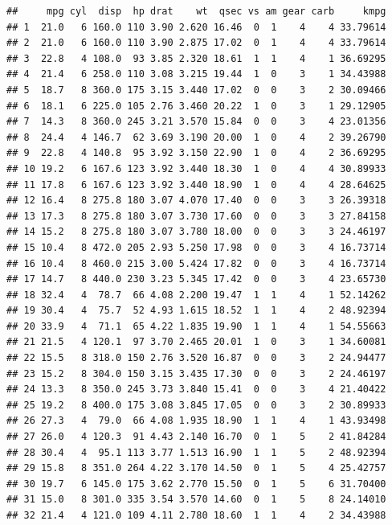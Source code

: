 \documentclass[]{report}
\newenvironment{Shaded}{\begin{snugshade}}{\end{snugshade}}
\newcommand{\KeywordTok}[1]{\textcolor[rgb]{0.13,0.29,0.53}{\textbf{#1}}}
\newcommand{\DataTypeTok}[1]{\textcolor[rgb]{0.13,0.29,0.53}{#1}}
\newcommand{\FloatTok}[1]{\textcolor[rgb]{0.00,0.00,0.81}{#1}}
\newcommand{\StringTok}[1]{\textcolor[rgb]{0.31,0.60,0.02}{#1}}
\newcommand{\OperatorTok}[1]{\textcolor[rgb]{0.81,0.36,0.00}{\textbf{#1}}}
\newcommand{\NormalTok}[1]{#1}
\begin{document}
\begin{Shaded}
\end{Shaded}

\begin{verbatim}
##     mpg cyl  disp  hp drat    wt  qsec vs am gear carb     kmpg
## 1  21.0   6 160.0 110 3.90 2.620 16.46  0  1    4    4 33.79614
## 2  21.0   6 160.0 110 3.90 2.875 17.02  0  1    4    4 33.79614
## 3  22.8   4 108.0  93 3.85 2.320 18.61  1  1    4    1 36.69295
## 4  21.4   6 258.0 110 3.08 3.215 19.44  1  0    3    1 34.43988
## 5  18.7   8 360.0 175 3.15 3.440 17.02  0  0    3    2 30.09466
## 6  18.1   6 225.0 105 2.76 3.460 20.22  1  0    3    1 29.12905
## 7  14.3   8 360.0 245 3.21 3.570 15.84  0  0    3    4 23.01356
## 8  24.4   4 146.7  62 3.69 3.190 20.00  1  0    4    2 39.26790
## 9  22.8   4 140.8  95 3.92 3.150 22.90  1  0    4    2 36.69295
## 10 19.2   6 167.6 123 3.92 3.440 18.30  1  0    4    4 30.89933
## 11 17.8   6 167.6 123 3.92 3.440 18.90  1  0    4    4 28.64625
## 12 16.4   8 275.8 180 3.07 4.070 17.40  0  0    3    3 26.39318
## 13 17.3   8 275.8 180 3.07 3.730 17.60  0  0    3    3 27.84158
## 14 15.2   8 275.8 180 3.07 3.780 18.00  0  0    3    3 24.46197
## 15 10.4   8 472.0 205 2.93 5.250 17.98  0  0    3    4 16.73714
## 16 10.4   8 460.0 215 3.00 5.424 17.82  0  0    3    4 16.73714
## 17 14.7   8 440.0 230 3.23 5.345 17.42  0  0    3    4 23.65730
## 18 32.4   4  78.7  66 4.08 2.200 19.47  1  1    4    1 52.14262
## 19 30.4   4  75.7  52 4.93 1.615 18.52  1  1    4    2 48.92394
## 20 33.9   4  71.1  65 4.22 1.835 19.90  1  1    4    1 54.55663
## 21 21.5   4 120.1  97 3.70 2.465 20.01  1  0    3    1 34.60081
## 22 15.5   8 318.0 150 2.76 3.520 16.87  0  0    3    2 24.94477
## 23 15.2   8 304.0 150 3.15 3.435 17.30  0  0    3    2 24.46197
## 24 13.3   8 350.0 245 3.73 3.840 15.41  0  0    3    4 21.40422
## 25 19.2   8 400.0 175 3.08 3.845 17.05  0  0    3    2 30.89933
## 26 27.3   4  79.0  66 4.08 1.935 18.90  1  1    4    1 43.93498
## 27 26.0   4 120.3  91 4.43 2.140 16.70  0  1    5    2 41.84284
## 28 30.4   4  95.1 113 3.77 1.513 16.90  1  1    5    2 48.92394
## 29 15.8   8 351.0 264 4.22 3.170 14.50  0  1    5    4 25.42757
## 30 19.7   6 145.0 175 3.62 2.770 15.50  0  1    5    6 31.70400
## 31 15.0   8 301.0 335 3.54 3.570 14.60  0  1    5    8 24.14010
## 32 21.4   4 121.0 109 4.11 2.780 18.60  1  1    4    2 34.43988
\end{verbatim}
\end{document}
